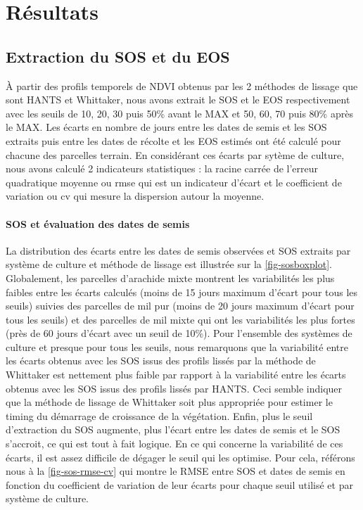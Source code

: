 \section{Résultats}

\subsection{Extraction du SOS et du EOS}

\`A partir des profils temporels de NDVI obtenus par les 2 méthodes de lissage que sont HANTS et Whittaker, nous avons extrait le SOS et le EOS respectivement avec les seuils de 10, 20, 30 puis 50\% avant le MAX et 50, 60, 70 puis 80\% après le MAX. Les écarts en nombre de jours entre les dates de semis et les SOS extraits puis entre les dates de récolte et les EOS estimés ont été calculé pour chacune des parcelles terrain. En considérant ces écarts par sytème de culture, nous avons calculé 2 indicateurs statistiques : la racine carrée de l'erreur quadratique moyenne ou \acrshort{rmse} qui est un indicateur d'écart et le coefficient de variation ou \acrshort{cv} qui mesure la dispersion autour la moyenne. 

\paragraph{SOS et évaluation des dates de semis}

La distribution des écarts entre les dates de semis observées et SOS extraits par système de culture et méthode de lissage est illustrée sur la \cref{fig-sosboxplot}. Globalement, les parcelles d'arachide mixte montrent les variabilités les plus faibles entre les écarts calculés (moins de 15 jours maximum d'écart pour tous les seuils) suivies des parcelles de mil pur (moins de 20 jours maximum d'écart pour tous les seuils) et des parcelles de mil mixte qui ont les variabilités les plus fortes (près de 60 jours d'écart avec un seuil de 10\%). Pour l'ensemble des systèmes de culture et presque pour tous les seuils, nous remarquons que la variabilité entre les écarts obtenus avec les SOS issus des profils lissés par la méthode de Whittaker est nettement plus faible par rapport à la variabilité entre les écarts obtenus avec les SOS issus des profils lissés par HANTS. Ceci semble indiquer que la méthode de lissage de Whittaker soit plus appropriée pour estimer le timing du démarrage de croissance de la végétation. Enfin, plus le seuil d'extraction du SOS augmente, plus l'écart entre les dates de semis et le SOS s'accroit, ce qui est tout à fait logique. En ce qui concerne la variabilité de ces écarts, il est assez difficile de dégager le seuil qui les optimise. Pour cela, référons nous à la \cref{fig-sos-rmse-cv} qui montre le RMSE entre SOS et dates de semis en fonction du coefficient de variation de leur écarts pour chaque seuil utilisé et par système de culture. 

